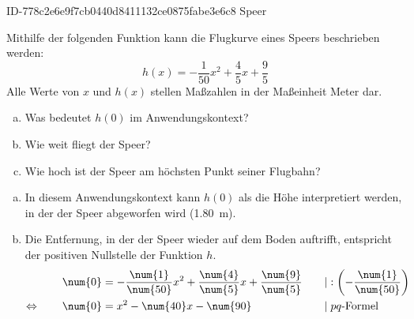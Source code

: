 \begin{exercise}
      {ID-778c2e6e9f7cb0440d8411132ce0875fabe3e6c8}
      {Speer}
  \ifproblem\problem\par
    Mithilfe der folgenden Funktion kann die Flugkurve
    eines Speers beschrieben werden:
    \begin{equation*}
      h(x)=-\frac{\num{1}}{\num{50}}x^{\num{2}}+\frac{\num{4}}{\num{5}}x+\frac{\num{9}}{\num{5}}
    \end{equation*}
    Alle Werte von $x$ und $h(x)$ stellen Maßzahlen in der
    Maßeinheit Meter dar.
    \begin{enumerate}[a)]
      \squeeze
      \item Was bedeutet $h(0)$ im Anwendungskontext?
      \item Wie weit fliegt der Speer?
      \item Wie hoch ist der Speer am höchsten Punkt seiner Flugbahn?
    \end{enumerate}
  \fi
  \ifoutcome\outcome
    \begin{enumerate}[a)]
      \item In diesem Anwendungskontext kann $h(0)$
            als die Höhe interpretiert werden,
            in der der Speer abgeworfen wird
            (\SI{1.80}{\metre}).
      \item Die Entfernung, in der der Speer wieder auf
            dem Boden auftrifft, entspricht der positiven
            Nullstelle der Funktion $h$.
            \begingroup
              \newcommand{\vstrut}{\vphantom{\left(f_0^0\right)}}%
              \newcommand{\noeq}{\phantom{\Leftrightarrow}\vstrut&\quad}%
              \newcommand{\iseq}{\Leftrightarrow\vstrut&\quad}%
              \newcommand{\impl}{\Rightarrow\vstrut&\quad}%
              \newcommand{\nomod}{\quad&\phantom{|}}%
              \newcommand{\domod}[1]{\quad&|#1}%
              \begin{alignat*}{3}
                \noeq
                &
                \num{0}&=-\frac{\num{1}}{\num{50}}x^{2}+\frac{\num{4}}{\num{5}}x+\frac{\num{9}}{\num{5}}
                &
                \domod{:\left(-\frac{\num{1}}{\num{50}}\right)}
                \\
                \iseq
                &
                \num{0}&=x^{2}-\num{40}x-\num{90}
                &
                \domod{\;\text{$pq$-Formel}}
                \\

\end{alignat*}
\end{enumerate}
\end{exercise}
